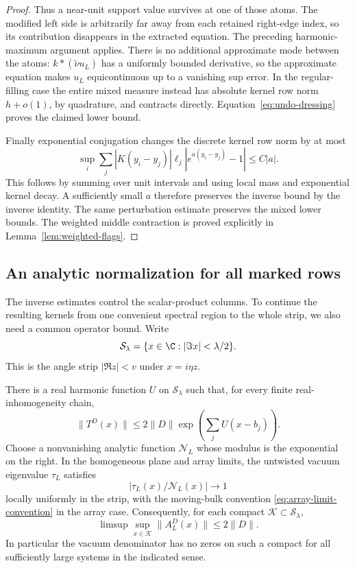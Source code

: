 \begin{proof}
Thus a near-unit support value survives at one of those atoms.
The modified left side is arbitrarily far away from each retained
right-edge index, so its contribution disappears in the extracted
equation.  The preceding harmonic-maximum argument applies.
There is no additional approximate mode between the atoms:
$k*(\widetilde\nu u_L)$ has a uniformly bounded derivative,
so the approximate equation makes $u_L$ equicontinuous up to a
vanishing sup error.  In the regular-filling case the entire
mixed measure instead has absolute kernel row norm $h+o(1)$,
by quadrature, and contracts directly.
Equation~\eqref{eq:undo-dressing} proves the claimed lower bound.

Finally exponential conjugation changes the discrete kernel row
norm by at most
\[
 \sup_i\sum_j |K(y_i-y_j)|\ell_j
             |e^{a(y_i-y_j)}-1|\le C|a|.
 \]
This follows by summing over unit intervals and using local mass
and exponential kernel decay.  A sufficiently small $a$ therefore
preserves the inverse bound by the inverse identity.
The same perturbation estimate preserves the mixed lower bounds.
The weighted middle contraction is proved explicitly in
Lemma~\ref{lem:weighted-flags}.
\end{proof}

\subsection{An analytic normalization for all marked rows}

The inverse estimates control the scalar-product columns.
To continue the resulting kernels from one convenient spectral
region to the whole strip, we also need a common operator bound.
Write
\[
 \mathcal S_\lambda=\{x\in\C:|\Im x|<\lambda/2\}.
\]
This is the angle strip $|\Re z|<v$ under $x=i\eta z$.

\begin{lemma}\label{lem:row-normalization}
There is a real harmonic function $U$ on $\mathcal S_\lambda$
such that, for every finite real-inhomogeneity chain,
\begin{equation}\label{eq:harmonic-row-bound}
 \|T^D(x)\|\le2\|D\|
                 \exp\left(\sum_jU(x-b_j)\right).
\end{equation}
Choose a nonvanishing analytic function $\mathcal N_L$ whose
modulus is the exponential on the right.  In the homogeneous plane
and array limits, the untwisted vacuum eigenvalue $\tau_L$ satisfies
\begin{equation}\label{eq:vacuum-modulus-normalization}
 |\tau_L(x)/\mathcal N_L(x)|\longrightarrow1
\end{equation}
locally uniformly in the strip, with the moving-bulk convention
\eqref{eq:array-limit-convention} in the array case.
Consequently, for each compact $\mathcal K\subset\mathcal S_\lambda$,
\begin{equation}\label{eq:normalized-row-bound}
 \limsup\sup_{x\in\mathcal K}\|A_L^D(x)\|\le2\|D\|.
\end{equation}
In particular the vacuum denominator has no zeros on such a compact
for all sufficiently large systems in the indicated sense.
\end{lemma}

